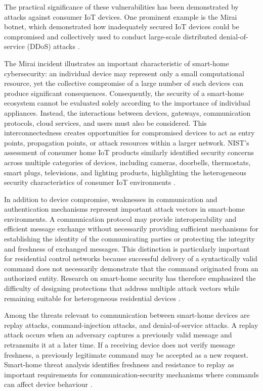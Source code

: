 The practical significance of these vulnerabilities has been demonstrated by attacks against consumer IoT devices. One prominent example is the Mirai botnet, which demonstrated how inadequately secured IoT devices could be compromised and collectively used to conduct large-scale distributed denial-of-service (DDoS) attacks \cite{antonakakisUnderstandingMiraiBotnet}.

The Mirai incident illustrates an important characteristic of smart-home cybersecurity: an individual device may represent only a small computational resource, yet the collective compromise of a large number of such devices can produce significant consequences. Consequently, the security of a smart-home ecosystem cannot be evaluated solely according to the importance of individual appliances. Instead, the interactions between devices, gateways, communication protocols, cloud services, and users must also be considered. This interconnectedness creates opportunities for compromised devices to act as entry points, propagation points, or attack resources within a larger network. NIST's assessment of consumer home IoT products similarly identified security concerns across multiple categories of devices, including cameras, doorbells, thermostats, smart plugs, televisions, and lighting products, highlighting the heterogeneous security characteristics of consumer IoT environments \citep{faganProfileIoTCore2022}.

In addition to device compromise, weaknesses in communication and authentication mechanisms represent important attack vectors in smart-home environments. A communication protocol may provide interoperability and efficient message exchange without necessarily providing sufficient mechanisms for establishing the identity of the communicating parties or protecting the integrity and freshness of exchanged messages. This distinction is particularly important for residential control networks because successful delivery of a syntactically valid command does not necessarily demonstrate that the command originated from an authorized entity. Research on smart-home security has therefore emphasized the difficulty of designing protections that address multiple attack vectors while remaining suitable for heterogeneous residential devices \citep{heartfieldTaxonomyCyberphysicalThreats2018}.

Among the threats relevant to communication between smart-home devices are replay attacks, command-injection attacks, and denial-of-service attacks. A replay attack occurs when an adversary captures a previously valid message and retransmits it at a later time. If a receiving device does not verify message freshness, a previously legitimate command may be accepted as a new request. Smart-home threat analysis identifies freshness and resistance to replay as important requirements for communication-security mechanisms where commands can affect device behaviour \citep{heartfieldTaxonomyCyberphysicalThreats2018}.

